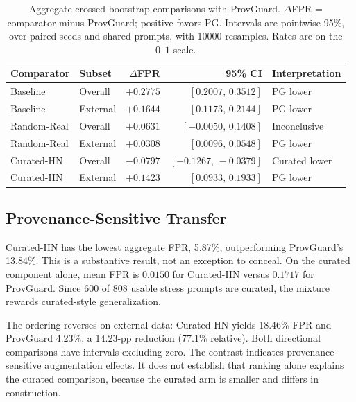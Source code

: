 \documentclass[conference]{IEEEtran}
\newcommand{\CurHBPct}{5.87}
\newcommand{\CurExtPct}{18.46}
\newcommand{\PGHBPct}{13.84}
\newcommand{\PGExtPct}{4.23}
\newcommand{\CurCuratedFPR}{0.0150}
\newcommand{\PGCuratedFPR}{0.1717}
\newcommand{\CurExtDropPP}{14.23}
\newcommand{\CurExtDropRel}{77.1}
\newcommand{\NHB}{808}
\newcommand{\NCuratedHB}{600}
\newcommand{\BootstrapN}{10000}
\begin{document}
\begin{table}[t]
\caption{Aggregate crossed-bootstrap comparisons with ProvGuard. $\Delta$FPR = comparator minus ProvGuard; positive favors PG. Intervals are pointwise 95\%, over paired seeds and shared prompts, with \BootstrapN{} resamples. Rates are on the $0$--$1$ scale.}
\label{tab:stats}
\centering\footnotesize
\setlength{\tabcolsep}{1.7pt}
\renewcommand{\arraystretch}{1.13}
\begin{tabular}{@{}llrrl@{}}
\toprule
Comparator & Subset & $\Delta$FPR & 95\% CI & Interpretation \\
\midrule
Baseline & Overall & $+0.2775$ & $[0.2007,\,0.3512]$ & PG lower \\
Baseline & External & $+0.1644$ & $[0.1173,\,0.2144]$ & PG lower \\
Random-Real & Overall & $+0.0631$ & $[-0.0050,\,0.1408]$ & Inconclusive \\
Random-Real & External & $+0.0308$ & $[0.0096,\,0.0548]$ & PG lower \\
Curated-HN & Overall & $-0.0797$ & $[-0.1267,\,-0.0379]$ & Curated lower \\
Curated-HN & External & $+0.1423$ & $[0.0933,\,0.1933]$ & PG lower \\
\bottomrule
\end{tabular}
\end{table}

\subsection{Provenance-Sensitive Transfer}
Curated-HN has the lowest aggregate FPR, \CurHBPct\%, outperforming ProvGuard's \PGHBPct\%. This is a substantive result, not an exception to conceal. On the curated component alone, mean FPR is $\CurCuratedFPR$ for Curated-HN versus $\PGCuratedFPR$ for ProvGuard. Since \NCuratedHB{} of \NHB{} usable stress prompts are curated, the mixture rewards curated-style generalization.

The ordering reverses on external data: Curated-HN yields \CurExtPct\% FPR and ProvGuard \PGExtPct\%, a \CurExtDropPP{}-pp reduction (\CurExtDropRel\% relative). Both directional comparisons have intervals excluding zero. The contrast indicates provenance-sensitive augmentation effects. It does not establish that ranking alone explains the curated comparison, because the curated arm is smaller and differs in construction.
\end{document}
